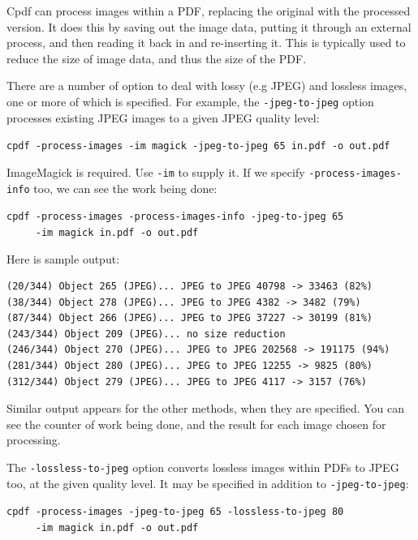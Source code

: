\documentclass{book}
\begin{document}
Cpdf can process images within a PDF, replacing the original with the processed version. It does this by saving out the image data, putting it through an external process, and then reading it back in and re-inserting it. This is typically used to reduce the size of image data, and thus the size of the PDF.

There are a number of option to deal with lossy (e.g JPEG) and lossless images, one or more of which is specified. For example, the \texttt{-jpeg-to-jpeg} option processes existing JPEG images to a given JPEG quality level:

  \begin{framed}
  \noindent\small\verb!cpdf -process-images -im magick -jpeg-to-jpeg 65 in.pdf -o out.pdf!
  \end{framed}

\noindent ImageMagick is required. Use \texttt{-im} to supply it. If we specify \texttt{-process-images-info} too, we can see the work being done:

  \begin{framed}
  \noindent\small\verb!cpdf -process-images -process-images-info -jpeg-to-jpeg 65!\\
  \noindent\small\verb!     -im magick in.pdf -o out.pdf!
  \end{framed}

\noindent Here is sample output:

\begin{framed}
{\small\begin{verbatim}
(20/344) Object 265 (JPEG)... JPEG to JPEG 40798 -> 33463 (82%)
(38/344) Object 278 (JPEG)... JPEG to JPEG 4382 -> 3482 (79%)
(87/344) Object 266 (JPEG)... JPEG to JPEG 37227 -> 30199 (81%)
(243/344) Object 209 (JPEG)... no size reduction
(246/344) Object 270 (JPEG)... JPEG to JPEG 202568 -> 191175 (94%)
(281/344) Object 280 (JPEG)... JPEG to JPEG 12255 -> 9825 (80%)
(312/344) Object 279 (JPEG)... JPEG to JPEG 4117 -> 3157 (76%)
\end{verbatim}}
  \end{framed}

\noindent Similar output appears for the other methods, when they are specified. You can see the counter of work being done, and the result for each image chosen for processing.

The \texttt{-lossless-to-jpeg} option converts lossless images within PDFs to JPEG too, at the given quality level. It may be specified in addition to \texttt{-jpeg-to-jpeg}:

  \begin{framed}
  \noindent\small\verb!cpdf -process-images -jpeg-to-jpeg 65 -lossless-to-jpeg 80!\\
  \noindent\small\verb!     -im magick in.pdf -o out.pdf!
  \end{framed}
\end{document}
